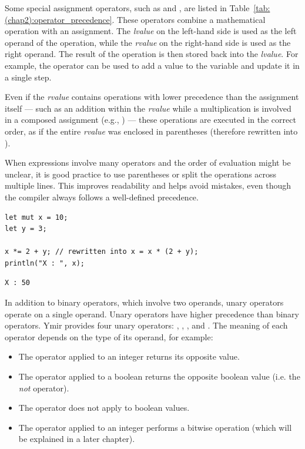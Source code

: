 

Some special assignment operators, such as \token{+=} and \token{-=}, are listed
in Table~\ref{tab:(chap2):operator_precedence}. These operators combine a
mathematical operation with an assignment. The \textit{lvalue} on the left-hand
side is used as the left operand of the operation, while the \textit{rvalue} on
the right-hand side is used as the right operand. The result of the operation is
then stored back into the \textit{lvalue}. For example, the operator \token{+=}
can be used to add a value to the variable  and update it in a single
step.


Even if the \textit{rvalue} contains
operations with lower precedence than the assignment itself — such as an
addition within the \textit{rvalue} while a multiplication is involved in a
composed assignment (e.g., ) — these operations are executed
in the correct order, as if the entire \textit{rvalue} was enclosed in
parentheses (therefore rewritten into ).


When expressions involve many operators and the order of evaluation
might be unclear, it is good practice to use parentheses or split the operations
across multiple lines. This improves readability and helps avoid mistakes, even
though the compiler always follows a well-defined precedence.

\begin{lstlisting}[style=coloredverbatim]
let mut x = 10;
let y = 3;

x *= 2 + y; // rewritten into x = x * (2 + y);
println("X : ", x);
\end{lstlisting}
\vspace{-10pt}%
\begin{lstlisting}[style=bashVerb]
X : 50
\end{lstlisting}


In addition to binary operators, which involve two operands, unary operators
operate on a single operand. Unary operators have higher precedence than binary
operators. Ymir provides four unary operators: \token{-}, \token{&}, \token{*},
and \token{!}. The meaning of each operator depends on the type of its operand,
for example:
\vspace{-8pt}%
\begin{itemize}
\setlength\itemsep{0.2mm}
\item The \token{-} operator applied to an integer returns its opposite value.
\item The \token{!} operator applied to a boolean returns the opposite boolean value (i.e. the \textit{not} operator).
\item The \token{-} operator does not apply to boolean values.
\item The \token{!} operator applied to an integer performs a bitwise operation (which will be explained in a later chapter).
\end{itemize}

